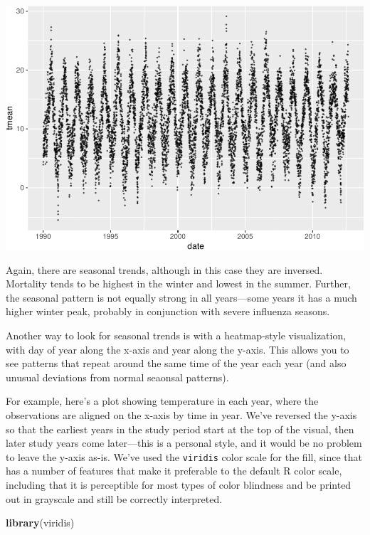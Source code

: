 \documentclass[
]{book}
\newenvironment{Shaded}{\begin{snugshade}}{\end{snugshade}}
\newcommand{\KeywordTok}[1]{\textcolor[rgb]{0.13,0.29,0.53}{\textbf{#1}}}
\newcommand{\NormalTok}[1]{#1}
\begin{document}
\includegraphics{adv_epi_analysis_files/figure-latex/unnamed-chunk-9-1.pdf}

Again, there are seasonal trends, although in this case they are inversed.
Mortality tends to be highest in the winter and lowest in the summer. Further, the
seasonal pattern is not equally strong in all years---some years it has a much
higher winter peak, probably in conjunction with severe influenza seasons.

Another way to look for seasonal trends is with a heatmap-style visualization,
with day of year along the x-axis and year along the y-axis. This allows you
to see patterns that repeat around the same time of the year each year (and
also unusual deviations from normal seaonsal patterns).

For example, here's a plot showing temperature in each year, where the
observations are aligned on the x-axis by time in year. We've reversed
the y-axis so that the earliest years in the study period start at the top
of the visual, then later study years come later---this is a personal style,
and it would be no problem to leave the y-axis as-is. We've used the
\texttt{viridis} color scale for the fill, since that has a number of features
that make it preferable to the default R color scale, including that it
is perceptible for most types of color blindness and be printed out in grayscale
and still be correctly interpreted.

\begin{Shaded}
\begin{Highlighting}[]
\KeywordTok{library}\NormalTok{(viridis)}
\end{Highlighting}
\end{Shaded}
\end{document}
